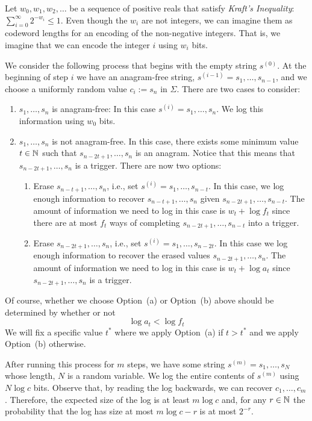 \documentclass{patmorin}
\begin{document}
Let $w_0,w_1,w_2,\ldots$ be a sequence of positive reals that satisfy \emph{Kraft's Inequality}: $\sum_{i=0}^\infty 2^{-w_i} \le 1$.  Even though the $w_i$ are not integers, we can imagine them as codeword lengths for an encoding of the non-negative integers.  That is, we imagine that we can encode the integer $i$ using $w_i$ bits.

We consider the following process that begins with the empty string $s^{(0)}$.  At the beginning of step $i$ we have an anagram-free string, $s^{(i-1)}=s_1,\ldots,s_{n-1}$, and we choose a uniformly random value $c_i:=s_n$ in $\Sigma$. There are two cases to consider:

\begin{enumerate}
  \item $s_1,\ldots,s_n$ is anagram-free:  In this case $s^{(i)}=s_1,\ldots,s_n$.  We log this information using $w_0$ bits.
  
  \item $s_1,\ldots,s_n$ is not anagram-free.  In this case, there exists some minimum value $t\in\mathbb{N}$ such that $s_{n-2t+1},\ldots,s_n$ is an anagram.   Notice that this means that $s_{n-2t+1},\ldots,s_n$ is a trigger. There are now two options:
  \begin{enumerate}
    \item Erase $s_{n-t+1},\ldots,s_n$, i.e., set $s^{(i)}=s_1,\ldots,s_{n-t}$.  In this case, we log enough information to recover $s_{n-t+1},\ldots,s_{n}$ given $s_{n-2t+1},\ldots,s_{n-t}$.  The amount of information we need to log in this case is $w_t + \log f_t$ since there are at most $f_t$ ways of completing $s_{n-2t+1},\ldots,s_{n-t}$ into a trigger.

    \item Erase $s_{n-2t+1},\ldots,s_n$, i.e., set $s^{(i)}=s_{1},\ldots,s_{n-2t}$.  In this case we log enough information to recover the erased values $s_{n-2t+1},\ldots,s_n$.  The amount of information we need to log in this case is $w_t+ \log a_t$ since $s_{n-2t+1},\ldots,s_{n}$ is a trigger.
  \end{enumerate}
\end{enumerate}
Of course, whether we choose Option~(a) or Option~(b) above should be determined by whether or not
\[
   \log a_t < \log f_t
\]
We will fix a specific value $t^*$ where we apply Option~(a) if $t>t^*$ and we apply Option~(b) otherwise.

After running this process for $m$ steps, we have some string $s^{(m)}=s_1,\ldots,s_N$ whose length, $N$ is a random variable.  We log the entire contents of $s^{(m)}$ using $N\log c$ bits.  Observe that, by reading the log backwards, we can recover $c_1,\ldots,c_m$.  Therefore, the expected size of the log is at least $m\log c$ and, for any $r\in\mathbb{N}$ the probability that the log has size at most $m\log c-r$ is at most $2^{-r}$.
\end{document}

